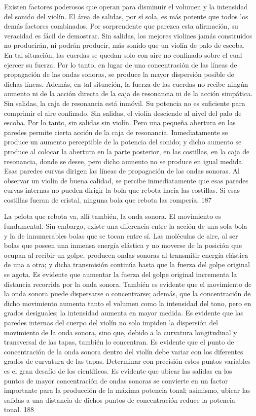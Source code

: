 Existen factores poderosos que operan para disminuir el volumen y la intensidad del sonido del violín. El área de salidas, por sí sola, es más potente que todos los demás factores combinados. Por sorprendente que parezca esta afirmación, su veracidad es fácil de demostrar. Sin salidas, los mejores violines jamás construidos no producirán, ni podrán producir, más sonido que un violín de palo de escoba. En tal situación, las cuerdas se quedan solo con aire no confinado sobre el cual ejercer su fuerza. Por lo tanto, en lugar de una concentración de las líneas de propagación de las ondas sonoras, se produce la mayor dispersión posible de dichas líneas. Además, en tal situación, la fuerza de las cuerdas no recibe ningún aumento ni de la acción directa de la caja de resonancia ni de la acción simpática. Sin salidas, la caja de resonancia está inmóvil. Su potencia no es suficiente para comprimir el aire confinado. Sin salidas, el violín
desciende al nivel del palo de escoba. Por lo tanto, sin salidas sin violín.
Pero una pequeña abertura en las paredes permite cierta acción de la caja de resonancia. Inmediatamente se produce un aumento perceptible de la potencia del sonido; y dicho aumento se produce al colocar la abertura en la parte posterior, en las costillas, en la caja de resonancia, donde se desee, pero dicho aumento no se produce en igual medida. Esas paredes curvas dirigen las líneas de propagación de las ondas sonoras. Al observar un violín de buena calidad, se percibe inmediatamente que esas paredes curvas internas no pueden dirigir la bola que rebota hacia las costillas. Si esas costillas fueran de cristal, ninguna bola que rebota las rompería.
187

La pelota que rebota va, allí también, la onda sonora.
El movimiento es fundamental. Sin embargo, existe una diferencia entre la acción de una sola bola y la de innumerables bolas que se tocan entre sí. Las moléculas de aire, al ser bolas que poseen una inmensa energía elástica y no moverse de la posición que ocupan al recibir un golpe, producen ondas sonoras al transmitir energía elástica de una a otra; y dicha transmisión continúa hasta que la fuerza del golpe original se agota. Es evidente que aumentar la fuerza del golpe original incrementa la distancia recorrida por la onda sonora. También es evidente que el movimiento de la onda sonora puede dispersarse o concentrarse; además, que la concentración de dicho movimiento aumenta tanto el volumen como la intensidad del tono, pero en grados desiguales; la intensidad aumenta en mayor medida. Es evidente que las paredes internas del cuerpo del violín no solo impiden la dispersión del movimiento de la onda sonora, sino que, debido a la curvatura longitudinal y transversal de las tapas, también lo concentran. Es evidente que el punto de concentración de la onda sonora dentro del violín debe variar con los diferentes grados de curvatura de las tapas. Determinar con precisión estos puntos variables es el gran desafío de los científicos. Es evidente que ubicar las salidas en los puntos de mayor concentración de ondas sonoras se convierte en un factor importante para la producción de la máxima potencia tonal; asimismo, ubicar las salidas a una distancia de dichos puntos de concentración reduce la potencia tonal.
188

